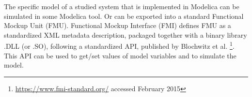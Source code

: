 The specific model of a studied system that is implemented in Modelica can be simulated in some Modelica tool. Or can be exported into a standard Functional Mockup Unit (FMU). Functional Mockup Interface (FMI) defines FMU as a standardized XML metadata description, packaged together with a binary library .DLL (or .SO), following a standardized API, published by Blochwitz et al. \cite{Blochwitza}\footnote{\url{https://www.fmi-standard.org/} accessed February 2015}. This API can be used to get/set values of model variables and to simulate the model.


%


